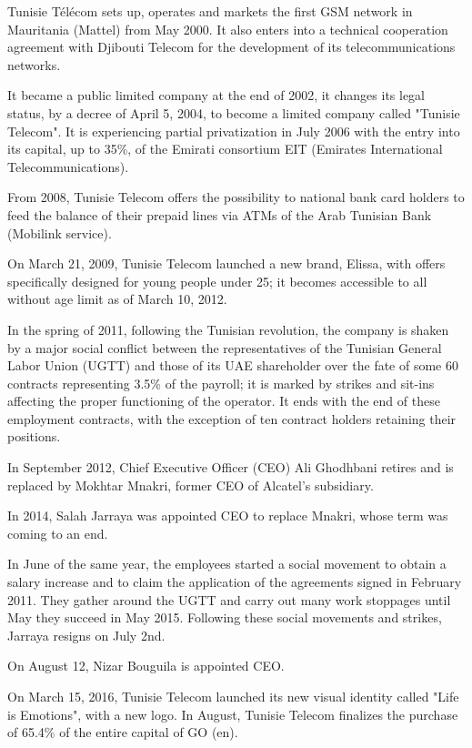 Tunisie Télécom sets up, operates and markets the first GSM network in Mauritania (Mattel) from May 2000. It also enters into a technical cooperation agreement with Djibouti Telecom for the development of its telecommunications networks.

It became a public limited company at the end of 2002, it changes its legal status, by a decree of April 5, 2004, to become a limited company called "Tunisie Telecom". It is experiencing partial privatization in July 2006 with the entry into its capital, up to 35\%, of the Emirati consortium EIT (Emirates International Telecommunications).

From 2008, Tunisie Telecom offers the possibility to national bank card holders to feed the balance of their prepaid lines via ATMs of the Arab Tunisian Bank (Mobilink service).

On March 21, 2009, Tunisie Telecom launched a new brand, Elissa, with offers specifically designed for young people under 25; it becomes accessible to all without age limit as of March 10, 2012.

In the spring of 2011, following the Tunisian revolution, the company is shaken by a major social conflict between the representatives of the Tunisian General Labor Union (UGTT) and those of its UAE shareholder over the fate of some 60 contracts representing 3.5\% of the payroll; it is marked by strikes and sit-ins affecting the proper functioning of the operator. It ends with the end of these employment contracts, with the exception of ten contract holders retaining their positions.

In September 2012, Chief Executive Officer (CEO) Ali Ghodhbani retires and is replaced by Mokhtar Mnakri, former CEO of Alcatel's subsidiary.

In 2014, Salah Jarraya was appointed CEO to replace Mnakri, whose term was coming to an end.

In June of the same year, the employees started a social movement to obtain a salary increase and to claim the application of the agreements signed in February 2011. They gather around the UGTT and carry out many work stoppages until May they succeed in May 2015. Following these social movements and strikes, Jarraya resigns on July 2nd.

On August 12, Nizar Bouguila is appointed CEO.

On March 15, 2016, Tunisie Telecom launched its new visual identity called "Life is Emotions", with a new logo. In August, Tunisie Telecom finalizes the purchase of 65.4\% of the entire capital of GO (en).

